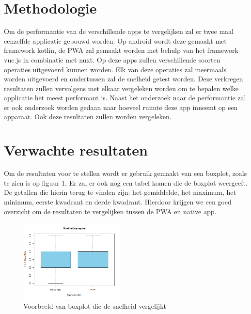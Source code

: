 
\section{Methodologie}
\label{sec:methodologie}
Om de performantie van de verschillende apps te vergelijken zal er twee maal eenzelfde applicatie gebouwd worden. Op android wordt deze gemaakt met framework kotlin, de PWA zal gemaakt worden met behulp van het framework vue.js in combinatie met nuxt. Op deze apps zullen verschillende soorten operaties uitgevoerd kunnen worden. Elk van deze operaties zal meermaals worden uitgevoerd en ondertussen zal de snelheid getest worden. Deze verkregen resultaten zullen vervolgens met elkaar vergeleken worden om te bepalen welke applicatie het meest performant is. Naast het onderzoek naar de performantie zal er ook onderzoek worden gedaan naar hoeveel ruimte deze app inneemt op een apparaat. Ook deze resultaten zullen worden vergeleken.


\section{Verwachte resultaten}
\label{sec:verwachte_resultaten}
Om de resultaten voor te stellen wordt er gebruik gemaakt van een boxplot, zoals te zien is op figuur 1. Er zal er ook nog een tabel komen die de boxplot weergeeft. De getallen die hierin terug te vinden zijn: het gemiddelde, het maximum, het minimum, eerste kwadrant en derde kwadrant. Hierdoor krijgen we een goed overzicht om de resultaten te vergelijken tussen de PWA en native app.

\begin{figure}[!h]
	\includegraphics[width=200px]{Rplot_Boxplot_Snelheidsanalyse.png}\centering
	\caption{Voorbeeld van boxplot die de snelheid vergelijkt}
\end{figure}

